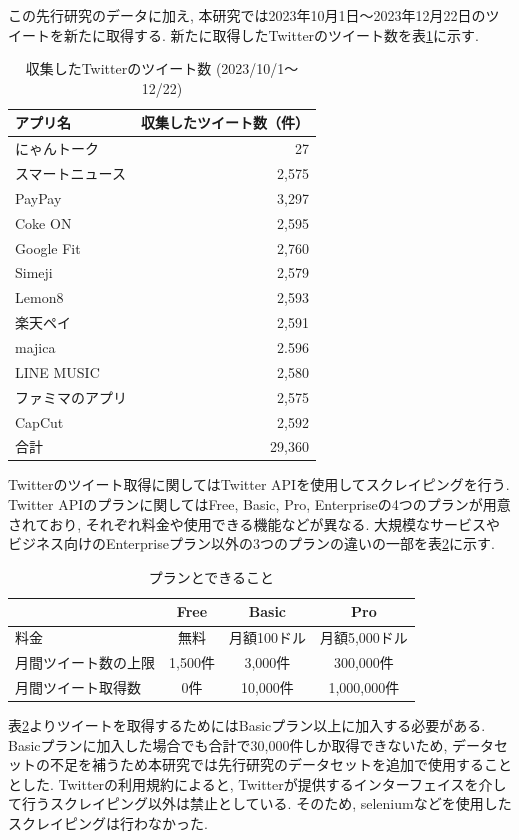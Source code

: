 \noindent
この先行研究のデータに加え, 本研究では2023年10月1日〜2023年12月22日のツイートを新たに取得する. 新たに取得したTwitterのツイート数を表\ref{tb:rawtweetnum2023}に示す. 

\begin{table}[H]
  \caption{収集したTwitterのツイート数 (2023/10/1〜12/22) }
  \label{tb:rawtweetnum2023}
  \begin{center}
  \begin{tabular}{l|r}
    \hline
    アプリ名&収集したツイート数（件）\\\hline\hline
    にゃんトーク&27\\\hline
    スマートニュース&2,575\\\hline
    PayPay&3,297\\\hline
    Coke ON&2,595\\\hline
    Google Fit&2,760\\\hline
    Simeji&2,579\\\hline
    Lemon8&2,593\\\hline
    楽天ペイ&2,591\\\hline
    majica&2.596\\\hline
    LINE MUSIC&2,580\\\hline
    ファミマのアプリ&2,575\\\hline
    CapCut&2,592\\\hline\hline
    合計&29,360
  \end{tabular}\end{center}
\end{table}

Twitterのツイート取得に関してはTwitter APIを使用してスクレイピングを行う. Twitter APIのプランに関してはFree, Basic, Pro, Enterpriseの4つのプランが用意されており, それぞれ料金や使用できる機能などが異なる. 大規模なサービスやビジネス向けのEnterpriseプラン以外の3つのプランの違いの一部を表\ref{tb:xplan}に示す. 

\begin{table}[H]
  \caption{プランとできること}
  \label{tb:xplan}
  \begin{center}
  \begin{tabular}{l|c|c|c}
    \hline
    &Free&Basic&Pro \\\hline\hline
    料金&無料&月額100ドル&月額5,000ドル \\\hline
    月間ツイート数の上限&1,500件&3,000件&300,000件 \\\hline
    月間ツイート取得数&0件&10,000件&1,000,000件 \\\hline
  \end{tabular}\end{center}
\end{table}
表\ref{tb:xplan}よりツイートを取得するためにはBasicプラン以上に加入する必要がある. Basicプランに加入した場合でも合計で30,000件しか取得できないため, データセットの不足を補うため本研究では先行研究のデータセットを追加で使用することとした. Twitterの利用規約によると, Twitterが提供するインターフェイスを介して行うスクレイピング以外は禁止としている. そのため, seleniumなどを使用したスクレイピングは行わなかった.  


